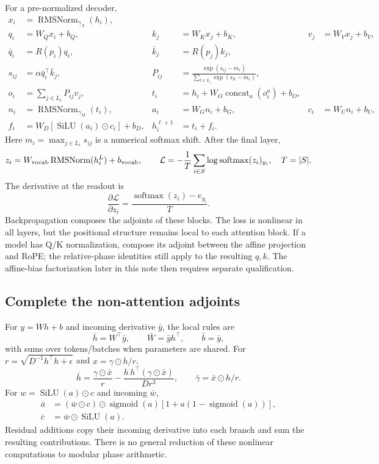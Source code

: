 \documentclass[11pt]{article}
\newcommand{\sm}{\operatorname{softmax}}
\newcommand{\sig}{\operatorname{sigmoid}}
\newcommand{\silu}{\operatorname{SiLU}}
\begin{document}
For a pre-normalized decoder,
\begin{align}
 x_i &= \operatorname{RMSNorm}_{\gamma_A}(h_i),\\
 q_i &= W_Qx_i+b_Q,& k_j&=W_Kx_j+b_K,&v_j&=W_Vx_j+b_V,\\
 \bar q_i&=R(p_i)q_i,&\bar k_j&=R(p_j)k_j,\\
 s_{ij}&=\alpha\bar q_i^\top\bar k_j,&
 P_{ij}&=\frac{\exp(s_{ij}-m_i)}{\sum_{t\in L_i}\exp(s_{it}-m_i)},\\
 o_i&=\sum_{j\in L_i}P_{ij}v_j,&
 t_i&=h_i+W_O\operatorname{concat}_a(o_i^a)+b_O,\\
 n_i&=\operatorname{RMSNorm}_{\gamma_M}(t_i),&
 a_i&=W_Gn_i+b_G,&c_i&=W_Un_i+b_U,\\
 f_i&=W_D[\silu(a_i)\odot c_i]+b_D,&
 h_i^{\ell+1}&=t_i+f_i.
\end{align}
Here $m_i=\max_{j\in L_i}s_{ij}$ is a numerical softmax shift. After the final layer,
\begin{equation}
 z_i=W_{\rm vocab}\operatorname{RMSNorm}(h_i^{L})+b_{\rm vocab},\qquad
 \mathcal L=-\frac1T\sum_{i\in S}\log\sm(z_i)_{y_i},\quad T=|S|.
\end{equation}
The derivative at the readout is
\begin{equation}
 \frac{\partial\mathcal L}{\partial z_i}=
 \frac{\sm(z_i)-e_{y_i}}{T}.
\end{equation}
Backpropagation composes the adjoints of these blocks. The loss is nonlinear in all layers, but the positional structure remains local to each attention block. If a model has Q/K normalization, compose its adjoint between the affine projection and RoPE; the relative-phase identities still apply to the resulting $q,k$. The affine-bias factorization later in this note then requires separate qualification.

\subsection{Complete the non-attention adjoints}

For $y=Wh+b$ and incoming derivative $\bar y$, the local rules are
\begin{equation}
 \bar h=W^\top\bar y,\qquad \bar W=\bar y h^\top,\qquad\bar b=\bar y,
\end{equation}
with sums over tokens/batches when parameters are shared. For $r=\sqrt{D^{-1}h^\top h+\epsilon}$ and $x=\gamma\odot h/r$,
\begin{equation}
 \bar h=\frac{\gamma\odot\bar x}{r}
 -\frac{h\,h^\top(\gamma\odot\bar x)}{D r^3},\qquad
 \bar\gamma=\bar x\odot h/r.
\end{equation}
For $w=\silu(a)\odot c$ and incoming $\bar w$,
\begin{align}
 \bar a&=(\bar w\odot c)\odot\sig(a)[1+a(1-\sig(a))],\\
 \bar c&=\bar w\odot\silu(a).
\end{align}
Residual additions copy their incoming derivative into each branch and sum the resulting contributions. There is no general reduction of these nonlinear computations to modular phase arithmetic.
\end{document}
